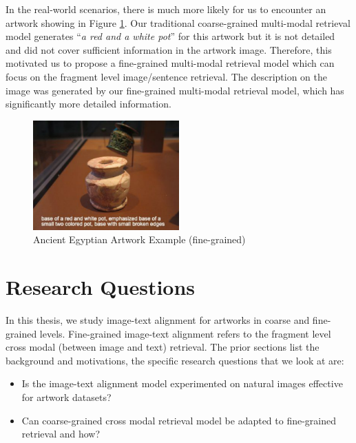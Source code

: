 In the real-world scenarios, there is much more likely for us to encounter an artwork showing in Figure \ref{fig:artwork2}. Our traditional coarse-grained multi-modal retrieval model generates ``\textit{a red and a white pot}'' for this artwork but it is not detailed and did not cover sufficient information in the artwork image. Therefore, this motivated us to propose a fine-grained multi-modal retrieval model which can focus on the fragment level image/sentence retrieval. The description on the image was generated by our fine-grained multi-modal retrieval model, which has significantly more detailed information.

\begin{figure}[h!]
\centering
\includegraphics[width=0.5\textwidth]{artwork_fine2.pdf}
\caption{Ancient Egyptian Artwork Example (fine-grained)}
\label{fig:artwork2}
\end{figure}

\section{Research Questions}

In this thesis, we study image-text alignment for artworks in coarse and fine-grained levels. Fine-grained image-text alignment refers to the fragment level cross modal (between image and text) retrieval. The prior sections list the background and motivations, the specific research questions that we look at are:

\begin{itemize}
    \item Is the image-text alignment model experimented on natural images effective for artwork datasets?
    \item Can coarse-grained cross modal retrieval model be adapted to fine-grained retrieval and how?
\end{itemize}

